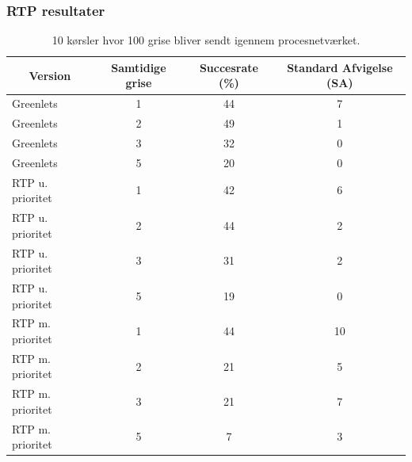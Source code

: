 \documentclass[12pt]{beamer}
\newcommand\mc[1]{\multicolumn{1}{c}{\textbf {#1}}} %
\begin{document}
\begin{frame}
\frametitle{RTP resultater}
\tiny 
\begin{table}[htbp]
	\centering
	\begin{tabular}{lccc}
       	\toprule
        \mc{Version}  &\mc{Samtidige grise} & \mc{Succesrate (\%)} & \mc{Standard Afvigelse (SA)} \\
        \midrule
        Greenlets        & 1 & 44 & 7 \\
        Greenlets        & 2 & 49 & 1 \\
        Greenlets        & 3 & 32 & 0\\
        Greenlets        & 5 & 20 & 0 \\
        \midrule
        RTP u. prioritet & 1 & 42 & 6 \\
        RTP u. prioritet & 2 & 44 & 2 \\
        RTP u. prioritet & 3 & 31 & 2 \\
        RTP u. prioritet & 5 & 19 & 0 \\
        \midrule
        RTP m. prioritet & 1 & 44 & 10\\
        RTP m. prioritet & 2 & 21 & 5\\
        RTP m. prioritet & 3 & 21 & 7\\
        RTP m. prioritet & 5 &  7 & 3\\
 
        \bottomrule
    \end{tabular}
	\caption[]{\tiny 10 kørsler hvor 100 grise bliver sendt igennem procesnetværket. }
\end{table}
\end{frame}
\end{document}
